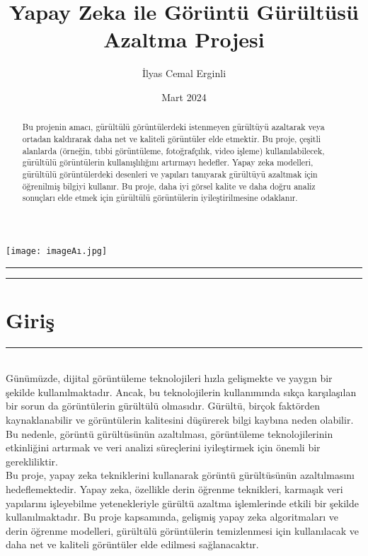\documentclass{article}
\title{Yapay Zeka ile Görüntü Gürültüsü Azaltma Projesi}
\author{İlyas Cemal Erginli}
\date{Mart 2024}
\begin{document}
\begin{titlepage}
    \maketitle
    \begin{center}
        \texttt{[image: imageAı.jpg]}
    \end{center}
    \thispagestyle{empty}
    \vfill
    \rule{\textwidth}{0.5pt}
    \renewcommand{\abstractname}{Özet}
    \begin{abstract}
    \noindent Bu projenin amacı, gürültülü görüntülerdeki istenmeyen gürültüyü azaltarak veya ortadan kaldırarak daha net ve kaliteli görüntüler elde etmektir. Bu proje, çeşitli alanlarda (örneğin, tıbbi görüntüleme, fotoğrafçılık, video işleme) kullanılabilecek, gürültülü görüntülerin kullanışlılığını artırmayı hedefler. Yapay zeka modelleri, gürültülü görüntülerdeki desenleri ve yapıları tanıyarak gürültüyü azaltmak için öğrenilmiş bilgiyi kullanır. Bu proje, daha iyi görsel kalite ve daha doğru analiz sonuçları elde etmek için gürültülü görüntülerin iyileştirilmesine odaklanır.
    \end{abstract}
    \rule{\textwidth}{0.5pt}
    \vfill
\end{titlepage}

\newpage
\section{Giriş}
\rule{\textwidth}{0.5pt}\\[10pt]
Günümüzde, dijital görüntüleme teknolojileri hızla gelişmekte ve yaygın bir şekilde kullanılmaktadır. Ancak, bu teknolojilerin kullanımında sıkça karşılaşılan bir sorun da görüntülerin gürültülü olmasıdır. Gürültü, birçok faktörden kaynaklanabilir ve görüntülerin kalitesini düşürerek bilgi kaybına neden olabilir. Bu nedenle, görüntü gürültüsünün azaltılması, görüntüleme teknolojilerinin etkinliğini artırmak ve veri analizi süreçlerini iyileştirmek için önemli bir gerekliliktir. \\[10pt]

 \noindent Bu proje, yapay zeka tekniklerini kullanarak görüntü gürültüsünün azaltılmasını hedeflemektedir. Yapay zeka, özellikle derin öğrenme teknikleri, karmaşık veri yapılarını işleyebilme yetenekleriyle gürültü azaltma işlemlerinde etkili bir şekilde kullanılmaktadır. Bu proje kapsamında, gelişmiş yapay zeka algoritmaları ve derin öğrenme modelleri, gürültülü görüntülerin temizlenmesi için kullanılacak ve daha net ve kaliteli görüntüler elde edilmesi sağlanacaktır.\\[10pt]
\end{document}
